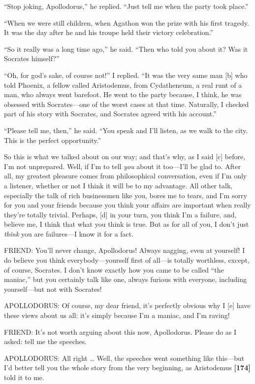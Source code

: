 “Stop joking, Apollodorus,” he replied. “Just tell me when the party
took place.”

“When we were still children, when Agathon won the prize with his first
tragedy. It was the day after he and his troupe held their victory
celebration.”

“So it really was a long time ago,” he said. “Then who told you about
it? Was it Socrates himself?”

“Oh, for god's sake, of course not!” I replied. “It was the very same
man {[}b{]} who told Phoenix, a fellow called Aristodemus, from
Cydatheneum, a real runt of a man, who always went barefoot. He went to
the party because, I think, he was obsessed with Socrates---one of the
worst cases at that time. Naturally, I checked part of his story with
Socrates, and Socrates agreed with his account.”

“Please tell me, then,” he said. “You speak and I'll listen, as we walk
to the city. This is the perfect opportunity.”

So this is what we talked about on our way; and that's why, as I said
{[}c{]} before, I'm not unprepared. Well, if I'm to tell {\em you} about
it too---I'll be glad to. After all, my greatest pleasure comes from
philosophical conversation, even if I'm only a listener, whether or not
I think it will be to my advantage. All other talk, especially the talk
of rich businessmen like you, bores me to tears, and I'm sorry for you
and your friends because you think your affairs are important when
really they're totally trivial. Perhaps, {[}d{]} in your turn, you think
I'm a failure, and, believe me, I think that what you think is true. But
as for all of you, I don't just {\em think} you are failures---I know it
for a fact.

FRIEND: You'll never change, Apollodorus! Always nagging, even at
yourself! I do believe you think everybody---yourself first of all---is
totally worthless, except, of course, Socrates. I don't know exactly how
you came to be called “the maniac,” but you certainly talk like one,
always furious with everyone, including yourself---but not with
Socrates!

APOLLODORUS: Of course, my dear friend, it's perfectly obvious why I
{[}e{]} have these views about us all: it's simply because I'm a maniac,
and I'm raving!

FRIEND: It's not worth arguing about this now, Apollodorus. Please do as
I asked: tell me the speeches.

APOLLODORUS: All right \ldots{} Well, the speeches went something like
this---but I'd better tell you the whole story from the very beginning,
as Aristodemus {\bf {[}174{]}} told it to me.

